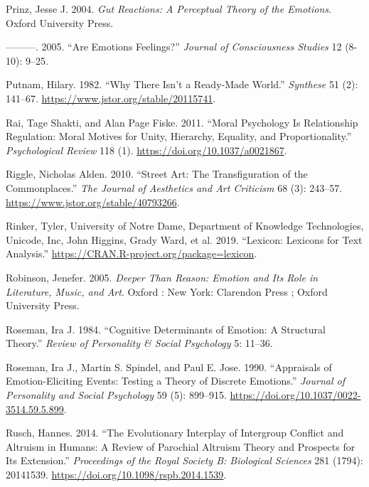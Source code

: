 \documentclass[12pt]{book}
\newenvironment{CSLReferences}%
  {\setlength{\parindent}{0pt}%
   \setlength{\leftskip}{0pt}%
   \setlength{\parskip}{0pt}}%
  {\par}
\theoremstyle{definition}
\theoremstyle{remark}
\begin{document}
\begin{CSLReferences}{1}{0}
Prinz, Jesse J. 2004. \emph{Gut {Reactions}: {A Perceptual Theory} of the {Emotions}}. Oxford University Press.

---------. 2005. {``Are Emotions Feelings?''} \emph{Journal of Consciousness Studies} 12 (8-10): 9--25.

Putnam, Hilary. 1982. {``Why {There Isn}'t a {Ready-Made World}.''} \emph{Synthese} 51 (2): 141--67. \url{https://www.jstor.org/stable/20115741}.

Rai, Tage Shakti, and Alan Page Fiske. 2011. {``Moral Psychology Is Relationship Regulation: Moral Motives for Unity, Hierarchy, Equality, and Proportionality.''} \emph{Psychological Review} 118 (1). \url{https://doi.org/10.1037/a0021867}.

Riggle, Nicholas Alden. 2010. {``Street {Art}: {The Transfiguration} of the {Commonplaces}.''} \emph{The Journal of Aesthetics and Art Criticism} 68 (3): 243--57. \url{https://www.jstor.org/stable/40793266}.

Rinker, Tyler, University of Notre Dame, Department of Knowledge Technologies, Unicode, Inc, John Higgins, Grady Ward, et al. 2019. {``Lexicon: {Lexicons} for {Text Analysis}.''} \url{https://CRAN.R-project.org/package=lexicon}.

Robinson, Jenefer. 2005. \emph{Deeper Than Reason: Emotion and Its Role in Literature, Music, and Art}. Oxford : New York: Clarendon Press ; Oxford University Press.

Roseman, Ira J. 1984. {``Cognitive Determinants of Emotion: {A} Structural Theory.''} \emph{Review of Personality \& Social Psychology} 5: 11--36.

Roseman, Ira J., Martin S. Spindel, and Paul E. Jose. 1990. {``Appraisals of Emotion-Eliciting Events: {Testing} a Theory of Discrete Emotions.''} \emph{Journal of Personality and Social Psychology} 59 (5): 899--915. \url{https://doi.org/10.1037/0022-3514.59.5.899}.

Rusch, Hannes. 2014. {``The Evolutionary Interplay of Intergroup Conflict and Altruism in Humans: A Review of Parochial Altruism Theory and Prospects for Its Extension.''} \emph{Proceedings of the Royal Society B: Biological Sciences} 281 (1794): 20141539. \url{https://doi.org/10.1098/rspb.2014.1539}.


\end{CSLReferences}
\end{document}
